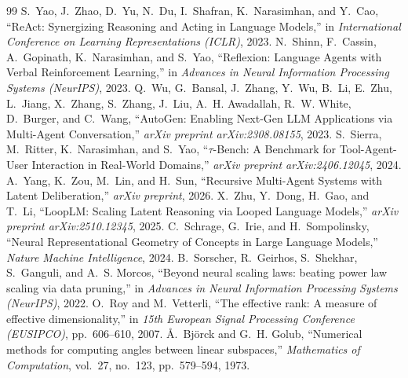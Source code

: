 \documentclass[a4paper, 12pt]{report}
\begin{document}
\ifdefined\isincluded
\else
\begin{thebibliography}{99}
 S.~Yao, J.~Zhao, D.~Yu, N.~Du, I.~Shafran, K.~Narasimhan, and Y.~Cao, ``ReAct: Synergizing Reasoning and Acting in Language Models,'' in \emph{International Conference on Learning Representations (ICLR)}, 2023.
 N.~Shinn, F.~Cassin, A.~Gopinath, K.~Narasimhan, and S.~Yao, ``Reflexion: Language Agents with Verbal Reinforcement Learning,'' in \emph{Advances in Neural Information Processing Systems (NeurIPS)}, 2023.
 Q.~Wu, G.~Bansal, J.~Zhang, Y.~Wu, B.~Li, E.~Zhu, L.~Jiang, X.~Zhang, S.~Zhang, J.~Liu, A.~H. Awadallah, R.~W. White, D.~Burger, and C.~Wang, ``AutoGen: Enabling Next-Gen LLM Applications via Multi-Agent Conversation,'' \emph{arXiv preprint arXiv:2308.08155}, 2023.
 S.~Sierra, M.~Ritter, K.~Narasimhan, and S.~Yao, ``$\tau$-Bench: A Benchmark for Tool-Agent-User Interaction in Real-World Domains,'' \emph{arXiv preprint arXiv:2406.12045}, 2024.
 A.~Yang, K.~Zou, M.~Lin, and H.~Sun, ``Recursive Multi-Agent Systems with Latent Deliberation,'' \emph{arXiv preprint}, 2026.
 X.~Zhu, Y.~Dong, H.~Gao, and T.~Li, ``LoopLM: Scaling Latent Reasoning via Looped Language Models,'' \emph{arXiv preprint arXiv:2510.12345}, 2025.
 C.~Schrage, G.~Irie, and H.~Sompolinsky, ``Neural Representational Geometry of Concepts in Large Language Models,'' \emph{Nature Machine Intelligence}, 2024.
 B.~Sorscher, R.~Geirhos, S.~Shekhar, S.~Ganguli, and A.~S. Morcos, ``Beyond neural scaling laws: beating power law scaling via data pruning,'' in \emph{Advances in Neural Information Processing Systems (NeurIPS)}, 2022.
 O.~Roy and M.~Vetterli, ``The effective rank: A measure of effective dimensionality,'' in \emph{15th European Signal Processing Conference (EUSIPCO)}, pp.~606--610, 2007.
 {\AA}.~Bj{\"o}rck and G.~H. Golub, ``Numerical methods for computing angles between linear subspaces,'' \emph{Mathematics of Computation}, vol.~27, no.~123, pp.~579--594, 1973.
\end{thebibliography}
\end{document}
